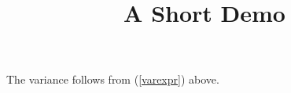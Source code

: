 \documentclass[article]{jss}
\title{A Short Demo}
\begin{document}
The variance follows from (\ref{varexpr}) above.
\end{document}

